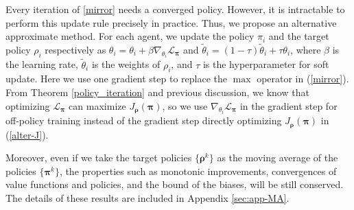 \documentclass{article}
\begin{document}
Every iteration of \eqref{mirror} needs a converged policy. However, it is intractable to perform this update rule precisely in practice. Thus, we propose an alternative approximate method. For each agent, we update the policy $\pi_i$ and the target policy $\rho_i$ respectively as  $\theta_i = \theta_i + \beta \nabla_{\theta_i} \mathcal{L}_{\bm{\pi}}$ and $\tilde{\theta}_i = (1 - \tau ) \tilde{\theta}_i + \tau \theta_i$, where $\beta$ is the learning rate, $\tilde{\theta}_i$ is the weights of $\rho_i$, and $\tau$ is the hyperparameter for soft update. Here we use one gradient step to replace the $\max$ operator in (\ref{mirror}). From Theorem \ref{policy_iteration} and previous discussion, we know that optimizing $\mathcal{L}_{\bm{\pi}}$ can maximize $J_{\bm{\rho}}({\bm{\pi}})$, so we use $\nabla_{\theta_i}\mathcal{L}_{\bm{\pi}}$ in the gradient step for off-policy training instead of the gradient step directly optimizing $J_{\bm{\rho}}({\bm{\pi}})$ in (\ref{alter-J}). 

Moreover, even if we take the target policies $\{\bm{\rho}^k\}$ as the moving average of the policies $\{\bm{\pi}^k\}$, the properties such as monotonic improvements, convergences of value functions and policies, and the bound of the biases, will be still conserved. The details of these results are included in Appendix \ref{sec:app-MA}.
\end{document}
